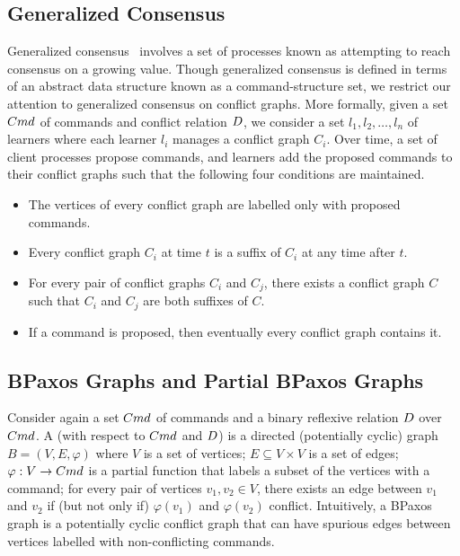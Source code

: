 \subsection{Generalized Consensus}
Generalized consensus~\cite{lamport1998part, sutra2011fast} involves a set of
processes known as  attempting to reach consensus on a
growing value. Though generalized consensus is defined in terms of an abstract
data structure known as a command-structure set, we restrict our attention to
generalized consensus on conflict graphs. More formally, given a set $Cmd$ of
commands and conflict relation $D$, we consider a set $l_1, l_2,
\ldots, l_n$ of learners where each learner $l_i$ manages a conflict graph
$C_i$. Over time, a set of client processes propose commands, and learners add
the proposed commands to their conflict graphs such that the following four
conditions are maintained.
\begin{itemize}
  \item {}
    The vertices of every conflict graph are labelled only with proposed
    commands.
  \item {}
    Every conflict graph $C_i$ at time $t$ is a suffix of $C_i$ at any time after
    $t$.
  \item {}
    For every pair of conflict graphs $C_i$ and $C_j$, there exists a conflict
    graph $C$ such that $C_i$ and $C_j$ are both suffixes of $C$.
  \item {}
    If a command is proposed, then eventually every conflict graph contains it.
\end{itemize}

\subsection{BPaxos Graphs and Partial BPaxos Graphs}
Consider again a set $Cmd$ of commands and a binary reflexive relation
$D$ over $Cmd$. A  (with respect to $Cmd$ and
$D$) is a directed (potentially cyclic) graph $B = (V, E, \varphi)$
where
%
  $V$ is a set of vertices;
%
  $E \subseteq V \times V$ is a set of edges;
%
  $\varphi: V \to Cmd$ is a partial function that labels a subset of the
  vertices with a command;
%
  for every pair of vertices $v_1, v_2 \in V$, there exists an edge between
  $v_1$ and $v_2$ if (but not only if) $\varphi(v_1)$ and $\varphi(v_2)$
  conflict.
%
Intuitively, a BPaxos graph is a potentially cyclic conflict graph that can
have spurious edges between vertices labelled with non-conflicting commands.

